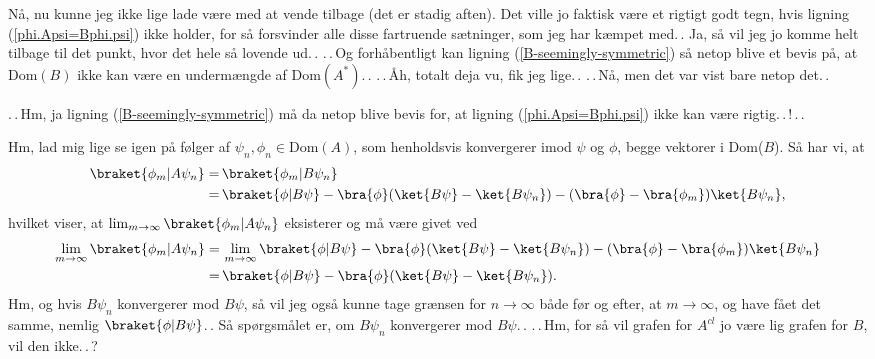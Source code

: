 \documentclass{report}
\begin{document}
Nå, nu kunne jeg ikke lige lade være med at vende tilbage (det er stadig aften). Det ville jo faktisk være et rigtigt godt tegn, hvis ligning (\ref{phi.Apsi=Bphi.psi}) ikke holder, for så forsvinder alle disse fartruende sætninger, som jeg har kæmpet med.\,. Ja, så vil jeg jo komme helt tilbage til det punkt, hvor det hele så lovende ud.\,. .\,.\,Og forhåbentligt kan ligning (\ref{B-seemingly-symmetric}) så netop blive et bevis på, at Dom$(B)$ ikke kan være en undermængde af Dom$(A^*)$.\,. .\,.\,Åh, totalt deja vu, fik jeg lige.\,. .\,.\,Nå, men det var vist bare netop det.\,. 

.\,.\,Hm, ja ligning (\ref{B-seemingly-symmetric}) må da netop blive bevis for, at ligning (\ref{phi.Apsi=Bphi.psi}) ikke kan være rigtig.\,.\,!\,.\,. 

Hm, lad mig lige se igen på følger af $\psi_n, \phi_n \in \mathrm{Dom}(A)$, som henholdsvis konvergerer imod $\psi$ og $\phi$, begge vektorer i Dom($B$). Så har vi, at
\begin{align}
\begin{aligned}
	\braket{\phi_m | A \psi_n} 
		=&\,
			\braket{\phi_m | B \psi_n} \\
		=&\,
			\braket{\phi | B\psi} 
				- \bra{\phi}(\ket{B \psi} - \ket{B \psi_n}) 
				- (\bra{\phi} - \bra{\phi_m})\ket{B \psi_n},
\end{aligned}
\end{align}
hvilket viser, at $\lim_{m\to\infty}\braket{\phi_m | A \psi_n}$ eksisterer og må være givet ved 
\begin{align}
\begin{aligned}
	\lim_{m\to \infty} \braket{\phi_m | A \psi_n} 
		=&\,
			\lim_{m\to \infty} \braket{\phi | B\psi} 
				- \bra{\phi}(\ket{B \psi} - \ket{B \psi_n}) 
				- (\bra{\phi} - \bra{\phi_m})\ket{B \psi_n} \\
		=&\,
			\braket{\phi | B\psi} 
				- \bra{\phi}(\ket{B \psi} - \ket{B \psi_n}) .
	\label{m-to-infty}
\end{aligned}
\end{align}
Hm, og hvis $B\psi_n$ konvergerer mod $B \psi$, så vil jeg også kunne tage grænsen for $n\to\infty$ både før og efter, at $m\to\infty$, og have fået det samme, nemlig $\braket{\phi | B\psi}$.\,. Så spørgsmålet er, om $B\psi_n$ konvergerer mod $B \psi$.\,. .\,.\,Hm, for så vil grafen for $A^{cl}$ jo være lig grafen for $B$, vil den ikke.\,.\,?
\end{document}

